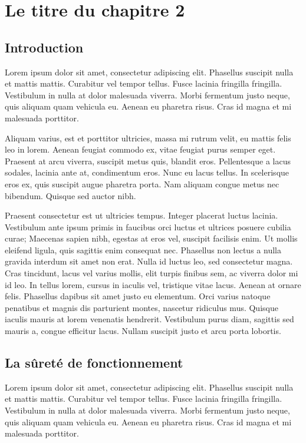 %
\chapter{Le titre du chapitre 2}
%
\section{Introduction}
Lorem ipsum dolor sit amet, consectetur adipiscing elit. Phasellus suscipit nulla et mattis mattis. Curabitur vel tempor tellus. 
Fusce lacinia fringilla fringilla. Vestibulum in nulla at dolor malesuada viverra. Morbi fermentum justo neque, quis aliquam quam vehicula eu. 
Aenean eu pharetra risus. Cras id magna et mi malesuada porttitor.

Aliquam varius, est et porttitor ultricies, massa mi rutrum velit, eu mattis felis leo in lorem. 
Aenean feugiat commodo ex, vitae feugiat purus semper eget. Praesent at arcu viverra, suscipit metus quis, blandit eros. 
Pellentesque a lacus sodales, lacinia ante at, condimentum eros. Nunc eu lacus tellus. In scelerisque eros ex, quis suscipit augue pharetra porta. 
Nam aliquam congue metus nec bibendum. Quisque sed auctor nibh.

Praesent consectetur est ut ultricies tempus. Integer placerat luctus lacinia. 
Vestibulum ante ipsum primis in faucibus orci luctus et ultrices posuere cubilia curae; Maecenas sapien nibh, egestas at eros vel, suscipit facilisis enim. 
Ut mollis eleifend ligula, quis sagittis enim consequat nec. Phasellus non lectus a nulla gravida interdum sit amet non erat. 
Nulla id luctus leo, sed consectetur magna. Cras tincidunt, lacus vel varius mollis, elit turpis finibus sem, ac viverra dolor mi id leo. 
In tellus lorem, cursus in iaculis vel, tristique vitae lacus. Aenean at ornare felis. Phasellus dapibus sit amet justo eu elementum. 
Orci varius natoque penatibus et magnis dis parturient montes, nascetur ridiculus mus. Quisque iaculis mauris at lorem venenatis hendrerit. 
Vestibulum purus diam, sagittis sed mauris a, congue efficitur lacus. Nullam suscipit justo et arcu porta lobortis.

\section{La sûreté de fonctionnement}
Lorem ipsum dolor sit amet, consectetur adipiscing elit. Phasellus suscipit nulla et mattis mattis. Curabitur vel tempor tellus. 
Fusce lacinia fringilla fringilla. Vestibulum in nulla at dolor malesuada viverra. Morbi fermentum justo neque, quis aliquam quam vehicula eu. 
Aenean eu pharetra risus. Cras id magna et mi malesuada porttitor.

